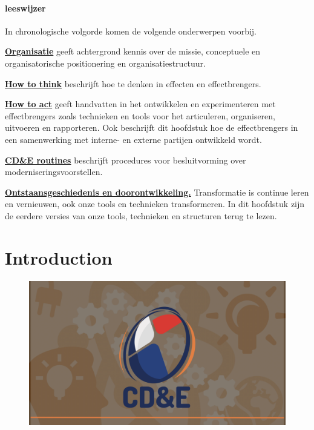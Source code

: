 \documentclass[
]{book}
\begin{document}
\hypertarget{leeswijzer}{%
\subsubsection*{leeswijzer}\label{leeswijzer}}

In chronologische volgorde komen de volgende onderwerpen voorbij.

\textbf{\protect\hyperlink{cde-algemeen}{Organisatie}}
geeft achtergrond kennis over de missie, conceptuele en organisatorische positionering en organisatiestructuur.

\textbf{\protect\hyperlink{kort-cyclisch-moderniseren}{How to think}}
beschrijft hoe te denken in effecten en effectbrengers.

\textbf{\protect\hyperlink{cde-design-model}{How to act}}
geeft handvatten in het ontwikkelen en experimenteren met effectbrengers zoals technieken en tools voor het articuleren, organiseren, uitvoeren en rapporteren. Ook beschrijft dit hoofdstuk hoe de effectbrengers in een samenwerking met interne- en externe partijen ontwikkeld wordt.

\textbf{\protect\hyperlink{cde-routines}{CD\&E routines}}
beschrijft procedures voor besluitvorming over moderniseringsvoorstellen.

\textbf{\protect\hyperlink{cde-process}{Ontstaansgeschiedenis en doorontwikkeling.}}
Transformatie is continue leren en vernieuwen, ook onze tools en technieken transformeren. In dit hoofdstuk zijn de eerdere versies van onze tools, technieken en structuren terug te lezen.

\hypertarget{intro}{%
\chapter{Introduction}\label{intro}}

\begin{figure}
\includegraphics[width=26.67in]{data/keynote-slides/20200430-CDE-Designprocess/20200430-CDE-Designprocess.001} \caption{ }\label{fig:unnamed-chunk-2}
\end{figure}
\end{document}
